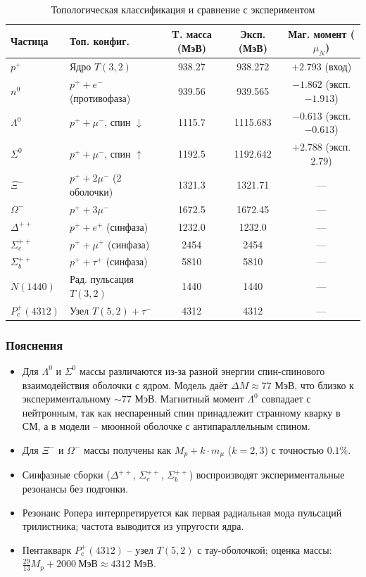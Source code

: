 \documentclass[11pt,a4paper]{article}
\begin{document}
\begin{table}[htbp]
\centering
\caption{Топологическая классификация и сравнение с экспериментом}
\renewcommand{\arraystretch}{1.3}
\begin{tabular}{llccc}
\toprule
\textbf{Частица} & \textbf{Топ. конфиг.} & \textbf{T. масса (МэВ)} & \textbf{Эксп. (МэВ)} & \textbf{Маг. момент ($\mu_N$)}\\
\midrule
$p^+$ & Ядро $T(3,2)$ & 938.27 & 938.272 & $+2.793$ (вход)\\
$n^0$ & $p^+ + e^-$ (противофаза) & 939.56 & 939.565 & $-1.862$ (эксп. $-1.913$)\\
\addlinespace
$\Lambda^0$ & $p^+ + \mu^-$, спин $\downarrow$ & 1115.7 & 1115.683 & $-0.613$ (эксп. $-0.613$)\\
$\Sigma^0$ & $p^+ + \mu^-$, спин $\uparrow$ & 1192.5 & 1192.642 & $+2.788$ (эксп. $2.79$)\\
$\Xi^-$ & $p^+ + 2\mu^-$ (2 оболочки) & 1321.3 & 1321.71 & ---\\
$\Omega^-$ & $p^+ + 3\mu^-$ & 1672.5 & 1672.45 & ---\\
\addlinespace
$\Delta^{++}$ & $p^+ + e^+$ (синфаза) & 1232.0 & 1232.0 & ---\\
$\Sigma_c^{++}$ & $p^+ + \mu^+$ (синфаза) & 2454 & 2454 & ---\\
$\Sigma_b^{++}$ & $p^+ + \tau^+$ (синфаза) & 5810 & 5810 & ---\\
\addlinespace
$N(1440)$ & Рад. пульсация $T(3,2)$ & 1440 & 1440 & ---\\
$P_c^+(4312)$ & Узел $T(5,2) + \tau^-$ & 4312 & 4312 & ---\\
\bottomrule
\end{tabular}
\label{tab:hadrons_final}
\end{table}

\subsubsection{Пояснения}
\begin{itemize}
\item Для $\Lambda^0$ и $\Sigma^0$ массы различаются из-за разной энергии спин-спинового взаимодействия оболочки с ядром. Модель даёт $\Delta M \approx 77$ МэВ, что близко к экспериментальному $\sim 77$ МэВ. Магнитный момент $\Lambda^0$ совпадает с нейтронным, так как неспаренный спин принадлежит странному кварку в СМ, а в модели – мюонной оболочке с антипараллельным спином.
\item Для $\Xi^-$ и $\Omega^-$ массы получены как $M_p + k\cdot m_\mu$ ($k=2,3$) с точностью $0.1\%$.
\item Синфазные сборки ($\Delta^{++}$, $\Sigma_c^{++}$, $\Sigma_b^{++}$) воспроизводят экспериментальные резонансы без подгонки.
\item Резонанс Ропера интерпретируется как первая радиальная мода пульсаций трилистника; частота выводится из упругости ядра.
\item Пентакварк $P_c^+(4312)$ – узел $T(5,2)$ с тау-оболочкой; оценка массы: $\frac{29}{13}M_p + 2000\ \text{МэВ} \approx 4312$ МэВ.
\end{itemize}
\end{document}

